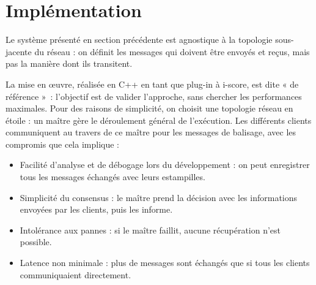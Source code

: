 \documentclass[10pt]{article}
\begin{document}
\begin{figure}[h]
	\centering
		\begin{tikzpicture}
		
		\end{tikzpicture}
        \label{scenar.depl-interactif-sync}
\end{figure}




\section{Implémentation}\label{sec.implementation}

Le système présenté en section précédente est agnostique à la topologie sous-jacente du réseau : on définit les messages qui doivent être envoyés et reçus, mais pas la manière dont ils transitent.

La mise en œuvre, réalisée en C++ en tant que plug-in à i-score, est dite « de référence »~: l'objectif est de valider l'approche, sans chercher les performances maximales.
Pour des raisons de simplicité, on choisit une topologie réseau en étoile : un maître gère le déroulement général de l'exécution. 
Les différents clients communiquent au travers de ce maître pour les messages de balisage, avec les compromis que cela implique : 
\begin{itemize}
    \item Facilité d'analyse et de débogage lors du développement : on peut enregistrer tous les messages échangés avec leurs estampilles.
    \item Simplicité du consensus : le maître prend la décision avec les informations envoyées par les clients, puis les informe.
    \item Intolérance aux pannes : si le maître faillit, aucune récupération n'est possible.
    \item Latence non minimale : plus de messages sont échangés que si tous les clients communiquaient directement.
\end{itemize}
\end{document}
